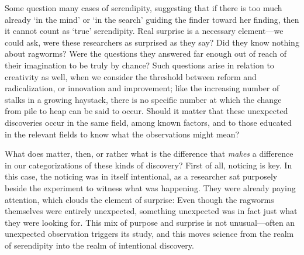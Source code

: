 \documentclass[authordate, empirical]{jote-new-article}
\begin{document}

	Some question many cases of serendipity, suggesting that if there is too much already ‘in the mind' or ‘in the search' guiding the finder toward her finding, then it cannot count as ‘true' serendipity. Real surprise is a necessary element—we could ask, were these researchers as surprised as they say? Did they know nothing about ragworms? Were the questions they answered far enough out of reach of their imagination to be truly by chance? Such questions arise in relation to creativity as well, when we consider the threshold between reform and radicalization, or innovation and improvement; like the increasing number of stalks in a growing haystack, there is no specific number at which the change from pile to heap can be said to occur. Should it matter that these unexpected discoveries occur in the same field, among known factors, and to those educated in the relevant fields to know what the observations might mean?



	What does matter, then, or rather what is the difference that \emph{makes} a difference in our categorizations of these kinds of discovery? First of all, noticing is key. In this case, the noticing was in itself intentional, as a researcher sat purposely beside the experiment to witness what was happening. They were already paying attention, which clouds the element of surprise: Even though the ragworms themselves were entirely unexpected, something unexpected was in fact just what they were looking for. This mix of purpose and surprise is not unusual—often an unexpected observation triggers its study, and this moves science from the realm of serendipity into the realm of intentional discovery.
\end{document}
